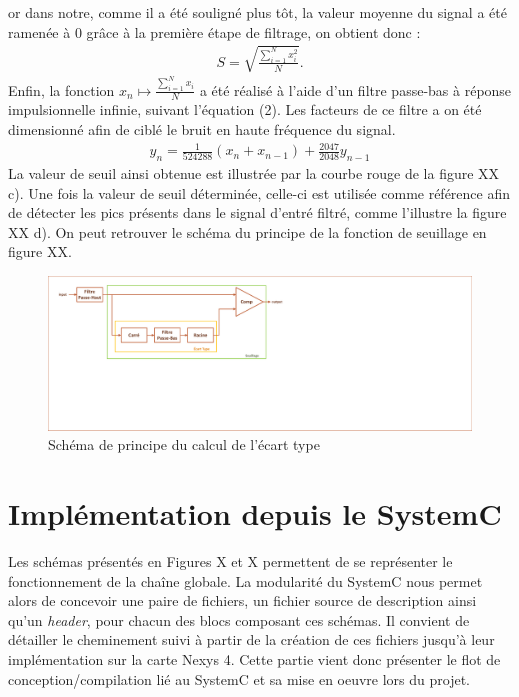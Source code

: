 \documentclass[a4paper,12pt]{article}
\begin{document}
\begin{itemize}
\begin{itemize}
or dans notre, comme il a été souligné plus tôt, la valeur moyenne du signal a été ramenée à 0 grâce à la première étape de filtrage, on obtient donc :
\begin{eqnarray*}
S = \sqrt{\frac{\sum^N_{i=1}x_i^2}{N}}.
\end{eqnarray*}
Enfin, la fonction $x_n\mapsto\frac{\sum^N_{i=1}x_i}{N}$ a été réalisé à l'aide d'un filtre passe-bas à réponse impulsionnelle infinie, suivant l'équation (2). Les facteurs de ce filtre a on été dimensionné afin de ciblé le bruit en haute fréquence du signal.
\begin{eqnarray}
y_n = \frac{1}{524288}\left(x_n + x_{n-1}\right) + \frac{2047}{2048}y_{n-1}
\end{eqnarray}
La valeur de seuil ainsi obtenue est illustrée par la courbe rouge de la figure XX c). Une fois la valeur de seuil déterminée, celle-ci est utilisée comme référence afin de détecter les pics présents dans le signal d'entré filtré, comme
 l'illustre la figure XX d). On peut retrouver le schéma du principe de la fonction de seuillage en figure XX.
\begin{figure}[H]
\centering
\includegraphics[width=\textwidth, keepaspectratio]{chainXavier.pdf}
\caption{Schéma de principe du calcul de l'écart type}
\end{figure}
\end{itemize}
\end{itemize}
\newpage
\section{Implémentation depuis le SystemC}
Les schémas présentés en Figures X et X permettent de se représenter le fonctionnement de la chaîne globale. La modularité du SystemC nous permet alors de concevoir une paire de fichiers, un fichier source de description ainsi qu'un \textit{header}, pour chacun des blocs composant ces schémas. Il convient de détailler le cheminement suivi à partir de la création de ces fichiers jusqu'à leur implémentation sur la carte Nexys 4. Cette partie vient donc présenter le flot de conception/compilation lié au SystemC et sa mise en oeuvre lors du projet.
\end{document}
